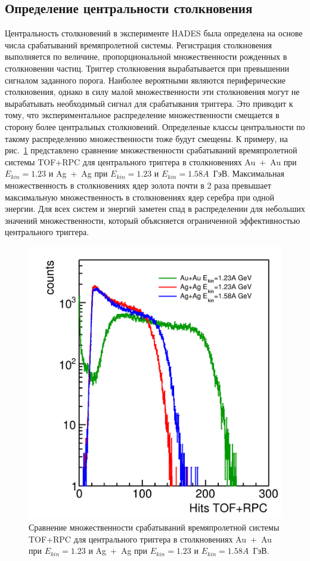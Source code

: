 \subsection{Определение центральности столкновения}

Центральность столкновений в эксперименте HADES была определена на основе числа срабатываний времяпролетной системы.
Регистрация столкновения выполняется по величине, пропорциональной множественности рожденных в столкновении частиц.
Триггер столкновения вырабатывается при превышении сигналом заданного порога.
Наиболее вероятными являются периферические столкновения, однако в силу малой множественности эти столкновения могут не вырабатывать необходимый сигнал для срабатывания триггера.
Это приводит к тому, что экспериментальное распределение множественности смещается в сторону более центральных столкновений.
Определеные классы центральности по такому распределению множественности тоже будут смещены.
К примеру, на рис.~\ref{fig:hades_multiplicity_comparison} представлено сравнение множественности срабатываний времяпролетной системы TOF+RPC для центрального триггера в столкновениях Au~+~Au при $E_{kin}=1.23$ и Ag~+~Ag при $E_{kin}=1.23$ и $E_{kin}=1.58A$~ГэВ.
Максимальная множественность в столкновениях ядер золота почти в 2 раза превышает максимальную множественность в столкновениях ядер серебра при одной энергии.
Для всех систем и энергий заметен спад в распределении для небольших значений множественности, который объясняется ограниченной эффективностью центрального триггера.
\begin{figure}[ht]
    \begin{center}
        \includegraphics[width=0.55\linewidth]{images/hades_multiplicity_comparison.png}
        \caption{Сравнение множественности срабатываний времяпролетной системы TOF+RPC для центрального триггера в столкновениях Au~+~Au при $E_{kin}=1.23$ и Ag~+~Ag при $E_{kin}=1.23$ и $E_{kin}=1.58A$~ГэВ.}
        \label{fig:hades_multiplicity_comparison}
    \end{center}
\end{figure}
        
